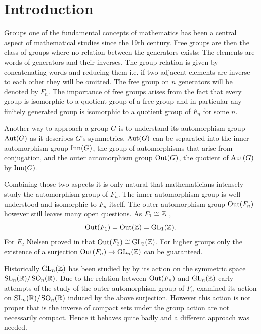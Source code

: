 %

\usepackage{todonotes}
\usepackage{./tikzit/tikzit}
\usepackage{biblatex}


\usepackage[stable]{footmisc}
\usepackage{caption}
\usepackage{subcaption}
\usepackage{listings}
\lstset{
	breakatwhitespace=True,
	breaklines=True,
	tabsize=2,
	extendedchars=True,
	keepspaces=True
}

	

\newpage
\section{Introduction}
Groups one of the fundamental concepts of mathematics has been a central aspect of mathematical studies since the 19th century.
Free groups are then the class of groups where no relation between the generators exists: 
The elements are words of generators and their inverses. The group relation is given by concatenating words
and reducing them i.e. if two adjacent elements are inverse to each other they will be omitted.
The free group on $n$ generators will be denoted by $F_{n}$.
The importance of free groups arises from the fact that every group is isomorphic to a quotient group of a free group
and in particular any finitely generated group is isomorphic to a quotient group of $F_{n}$ for some $n$.

Another way to approach a group $G$ is to understand its automorphism group $\operatorname{Aut}(G)$ as it describes $G$'s symmetries.
$\operatorname{Aut}(G)$ can be separated into the inner automorphism group $\operatorname{Inn}(G)$,
the group of automorphisms that arise from conjugation, and the outer automorphism group $\operatorname{Out}(G)$, the quotient of  $\operatorname{Aut}(G)$ by $\operatorname{Inn}(G)$.

Combining those two aspects it is only natural that mathematicians intensely study the automorphism group of $F_{n}$.
The inner automorphism group is well understood and isomorphic to $F_{n}$ itself.
The outer automorphism group $\operatorname{Out}(F_{n})$ however still leaves many open questions.
As $F_{1} \cong \mathbb{Z}$ ,
\[
	\operatorname{Out}(F_1) = \operatorname{Out}(\mathbb{Z}) = \operatorname{GL}_{1}(\mathbb{Z})
.\] 
For $F_{2}$ Nielsen proved in \cite{nielsen17} that $\operatorname{Out}(F_2) \cong \operatorname{GL}_{2}(\mathbb{Z})$.
For higher groups only the existence of a surjection $\operatorname{Out}(F_{n}) \to \operatorname{GL}_{n}(\mathbb{Z})$ can be guaranteed.

Historically $\operatorname{GL}_{n}(\mathbb{Z})$ has been studied by by its action on the symmetric space $\operatorname{SL}_{n}(\mathbb{R}) / \operatorname{SO}_{n}(\mathbb{R})$.
Due to the relation between $\operatorname{Out}(F_{n})$ and $\operatorname{GL}_{n}(\mathbb{Z})$ early attempts of the study of the outer automorphism group of $F_{n}$
examined its action on $\operatorname{SL}_{n}(\mathbb{R}) / \operatorname{SO}_{n}(\mathbb{R})$ induced by the above surjection.
However this action is not proper that is the inverse of compact sets under the group action are not necessarily compact.
Hence it behaves quite badly and a different approach was needed.

